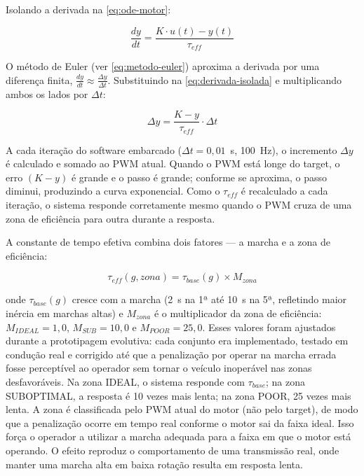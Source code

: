 Isolando a derivada na \autoref{eq:ode-motor}:

\begin{equation}
\label{eq:derivada-isolada}
\frac{dy}{dt} = \frac{K \cdot u(t) - y(t)}{\tau_{eff}}
\end{equation}

\noindent O método de Euler (ver \autoref{eq:metodo-euler}) aproxima a derivada por uma diferença finita, $\frac{dy}{dt} \approx \frac{\Delta y}{\Delta t}$. Substituindo na \autoref{eq:derivada-isolada} e multiplicando ambos os lados por $\Delta t$:

\begin{equation}
\label{eq:euler-motor}
\Delta y = \frac{K - y}{\tau_{eff}} \cdot \Delta t
\end{equation}

\noindent A cada iteração do software embarcado ($\Delta t = 0{,}01$~s, 100~Hz), o incremento $\Delta y$ é calculado e somado ao PWM atual. Quando o PWM está longe do target, o erro $(K - y)$ é grande e o passo é grande; conforme se aproxima, o passo diminui, produzindo a curva exponencial. Como o $\tau_{eff}$ é recalculado a cada iteração, o sistema responde corretamente mesmo quando o PWM cruza de uma zona de eficiência para outra durante a resposta.

A constante de tempo efetiva combina dois fatores --- a marcha e a zona de eficiência:

\begin{equation}
\label{eq:tau-efetivo}
\tau_{eff}(g, zona) = \tau_{base}(g) \times M_{zona}
\end{equation}

\noindent onde $\tau_{base}(g)$ cresce com a marcha (2~s na 1ª até 10~s na 5ª, refletindo maior inércia em marchas altas) e $M_{zona}$ é o multiplicador da zona de eficiência: $M_{IDEAL} = 1{,}0$, $M_{SUB} = 10{,}0$ e $M_{POOR} = 25{,}0$. Esses valores foram ajustados durante a prototipagem evolutiva: cada conjunto era implementado, testado em condução real e corrigido até que a penalização por operar na marcha errada fosse perceptível ao operador sem tornar o veículo inoperável nas zonas desfavoráveis. Na zona IDEAL, o sistema responde com $\tau_{base}$; na zona SUBOPTIMAL, a resposta é 10 vezes mais lenta; na zona POOR, 25 vezes mais lenta. A zona é classificada pelo PWM atual do motor (não pelo target), de modo que a penalização ocorre em tempo real conforme o motor sai da faixa ideal. Isso força o operador a utilizar a marcha adequada para a faixa em que o motor está operando. O efeito reproduz o comportamento de uma transmissão real, onde manter uma marcha alta em baixa rotação resulta em resposta lenta.

